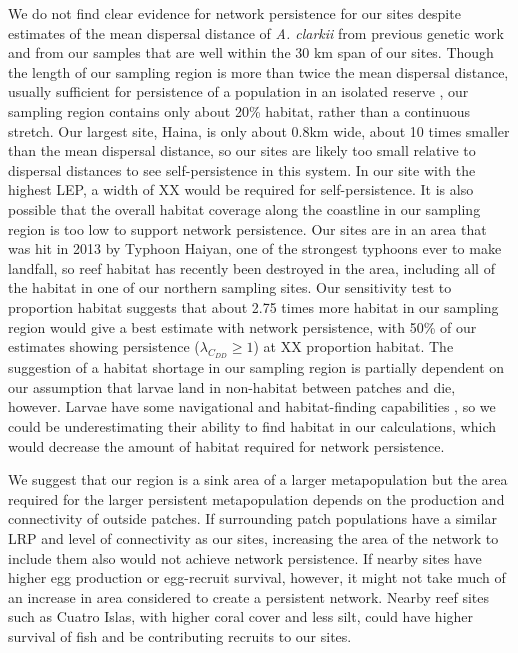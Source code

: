 \documentclass[12pt, oneside]{article}   	%
\begin{document}
We do not find clear evidence for network persistence for our sites despite estimates of the mean dispersal distance of \textit{A. clarkii} from previous genetic work \citep[11 km,][]{pinsky2010using} and from our samples \citep{catalanoInPrepconnectivity} that are well within the 30 km span of our sites. Though the length of our sampling region is more than twice the mean dispersal distance, usually sufficient for persistence of a population in an isolated reserve \citep[e.g.][]{lockwood2002effects}, our sampling region contains only about 20\% habitat, rather than a continuous stretch. Our largest site, Haina, is only about 0.8km wide, about 10 times smaller than the mean dispersal distance, so our sites are likely too small relative to dispersal distances to see self-persistence in this system. In our site with the highest LEP, a width of XX would be required for self-persistence. It is also possible that the overall habitat coverage along the coastline in our sampling region is too low to support network persistence. Our sites are in an area that was hit in 2013 by Typhoon Haiyan, one of the strongest typhoons ever to make landfall, so reef habitat has recently been destroyed in the area, including all of the habitat in one of our northern sampling sites. Our sensitivity test to proportion habitat suggests that about 2.75 times more habitat in our sampling region would give a best estimate with network persistence, with 50\% of our estimates showing persistence ($\lambda_{C_{DD}} \geq 1$) at XX proportion habitat. The suggestion of a habitat shortage in our sampling region is partially dependent on our assumption that larvae land in non-habitat between patches and die, however. Larvae have some navigational and habitat-finding capabilities \citep[e.g.][]{elliott1995host, fisher2005swimming}, so we could be underestimating their ability to find habitat in our calculations, which would decrease the amount of habitat required for network persistence.

We suggest that our region is a sink area of a larger metapopulation but the area required for the larger persistent metapopulation depends on the production and connectivity of outside patches. If surrounding patch populations have a similar LRP and level of connectivity as our sites, increasing the area of the network to include them also would not achieve network persistence. If nearby sites have higher egg production or egg-recruit survival, however, it might not take much of an increase in area considered to create a persistent network. Nearby reef sites such as Cuatro Islas, with higher coral cover and less silt, could have higher survival of fish and be contributing recruits to our sites. %
\end{document}
